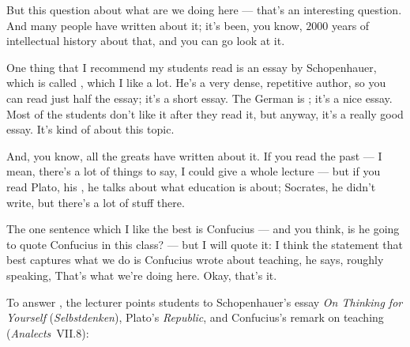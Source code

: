 \begin{speech}[00:41:36 - 00:43:02]
But this question about what are we doing here --- that's an interesting question. And many people have written about it; it's been, you know, $2000$ years of intellectual history about that, and you can go look at it.

One thing that I recommend my students read is an essay by Schopenhauer, which is called , which I like a lot. He's a very dense, repetitive author, so you can read just half the essay; it's a short essay. The German is ; it's a nice essay. Most of the students don't like it after they read it, but anyway, it's a really good essay. It's kind of about this topic.

And, you know, all the greats have written about it. If you read the past --- I mean, there's a lot of things to say, I could give a whole lecture --- but if you read Plato, his , he talks about what education is about; Socrates, he didn't write, but there's a lot of stuff there.

The one sentence which I like the best is Confucius --- and you think, is he going to quote Confucius in this class? --- but I will quote it: I think the statement that best captures what we do is Confucius wrote about teaching, he says, roughly speaking,  That's what we're doing here. Okay, that's it. 
\end{speech}

\begin{insight}
To answer , the lecturer points students to Schopenhauer's essay \emph{On Thinking for Yourself} (\emph{Selbstdenken}), Plato's \emph{Republic}, and Confucius's remark on teaching (\emph{Analects}~VII.8): 
\end{insight}

\begin{hidden}
\end{hidden}

